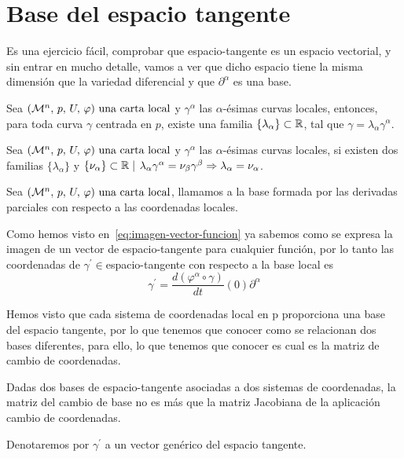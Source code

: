 \section{Base del espacio tangente}\label{sec:base-espacio-tangente}

Es una ejercicio fácil, comprobar que \gls{espacio-tangente} es un espacio vectorial, y sin entrar en mucho
detalle, vamos a ver que dicho espacio tiene la misma dimensión que la variedad diferencial y que ${\partial^\alpha}$ es una base.

\begin{proposition}
  Sea $(\mathcal{M}^n,\thinspace p,\thinspace U,\thinspace \varphi)\textmd{ una carta local}$ y ${\gamma^\alpha}$ las $\alpha$-ésimas curvas locales, entonces, para toda curva $\gamma$
  centrada en $p$, existe una familia $\{\lambda_\alpha\}\subset\mathbb{R}$, tal que $\gamma=\lambda_\alpha\gamma^\alpha$.
\end{proposition}

\begin{proposition}
  Sea $(\mathcal{M}^n,\thinspace p,\thinspace U,\thinspace \varphi)\textmd{ una carta local}$ y ${\gamma^\alpha}$ las $\alpha$-ésimas curvas locales, si existen dos familias
  $\{\lambda_\alpha\}$ y $\{\nu_\alpha\}\subset\mathbb{R}\mid$
  $\lambda_\alpha\gamma^\alpha=\nu_\beta\gamma^\beta\Rightarrow\lambda_\alpha=\nu_\alpha$.
\end{proposition}

\begin{definition}
  Sea $(\mathcal{M}^n,\thinspace p,\thinspace U,\thinspace \varphi)\textmd{ una carta local}$, llamamos  a la base
  formada por las derivadas parciales con respecto a las coordenadas locales.
\end{definition}

Como hemos visto en~\ref{eq:imagen-vector-funcion} ya sabemos como se expresa la imagen de un vector de
\gls{espacio-tangente} para cualquier función, por lo tanto las coordenadas de $\gamma^{'}\in$\gls{espacio-tangente}
con respecto a la base local es
\begin{equation}\label{eq:vector-tangente-coordenadas-locales}
\gamma^{'}=\frac{d(\varphi^\alpha\circ\gamma)}{dt}(0)\partial^\alpha
\end{equation}

Hemos visto que cada sistema de coordenadas local en p proporciona una base del espacio tangente, por lo que tenemos
que conocer como se relacionan dos bases diferentes, para ello, lo que tenemos que conocer es cual es la matriz de
cambio de coordenadas.

\begin{proposition}
  Dadas dos bases de \gls{espacio-tangente} asociadas a dos sistemas de coordenadas, la matriz del cambio de base no es
  más que la matriz Jacobiana de la aplicación cambio de coordenadas.
\end{proposition}

\begin{notation}
  Denotaremos por $\gamma^{'}$ a un vector genérico del espacio tangente.
\end{notation}